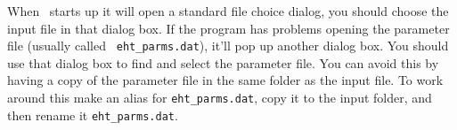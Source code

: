 When \calcprog\ starts up it will open a standard file choice dialog,
you should choose the input file in that dialog box.  If the program
has problems opening the parameter file (usually called {\tt
eht\_parms.dat}), it'll pop up another dialog box.  You should use that
dialog box to find and select the parameter file.  You can avoid this
by having a copy of the parameter file in the same folder as the input file.
To work around this make an alias for {\tt eht\_parms.dat}, copy it to 
the input folder, and then rename it {\tt eht\_parms.dat}.









